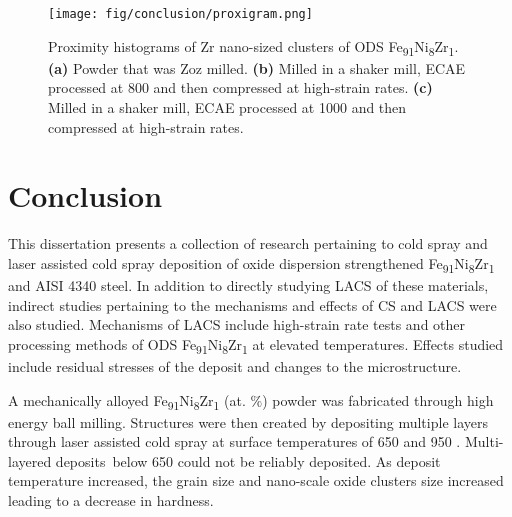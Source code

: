 	
		
		\begin{figure}
			\centering
			\texttt{[image: fig/conclusion/proxigram.png]}
			\caption[Proximity histograms of Zr nano-sized clusters of ODS Fe\textsubscript{91}Ni\textsubscript{8}Zr\textsubscript{1}.]{Proximity histograms of Zr nano-sized clusters of ODS Fe\textsubscript{91}Ni\textsubscript{8}Zr\textsubscript{1}. \textbf{(a) }Powder that was\textbf{ }Zoz milled. \textbf{(b) }Milled in a shaker mill, ECAE processed at 800 \celsius{} and then compressed at high-strain rates. \textbf{(c)} Milled in a shaker mill, ECAE processed at 1000 \celsius{} and then compressed at high-strain rates.}
			\label{fig:proxigram}
		\end{figure}
		
\section*{Conclusion}
		
		This dissertation presents a collection of research pertaining to cold spray and laser assisted cold spray deposition of oxide dispersion strengthened Fe\textsubscript{91}Ni\textsubscript{8}Zr\textsubscript{1} and AISI 4340 steel. In addition to directly studying LACS of these materials, indirect studies pertaining to the mechanisms and effects of CS and LACS were also studied. Mechanisms of LACS include high-strain rate tests and other processing methods of ODS Fe\textsubscript{91}Ni\textsubscript{8}Zr\textsubscript{1} at elevated temperatures. Effects studied include residual stresses of the deposit and changes to the microstructure.
		
		A mechanically alloyed Fe\textsubscript{91}Ni\textsubscript{8}Zr\textsubscript{1} (at. $\%$) powder was fabricated through high energy ball milling. Structures were then created by depositing multiple layers through laser assisted cold spray at surface temperatures of 650 \celsius{} and 950 \celsius{}. Multi-layered deposits\ below 650 \celsius{} could not be reliably deposited. As deposit temperature increased, the grain size and nano-scale oxide clusters size increased leading to a decrease in hardness.  
		
